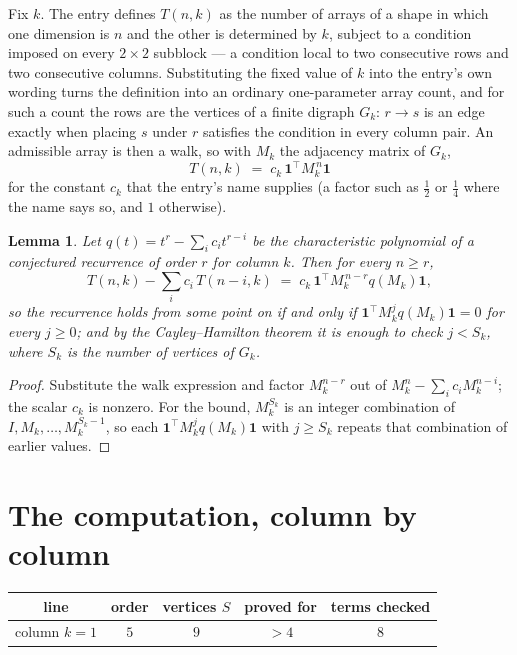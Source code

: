 \documentclass[11pt,a4paper]{article}
\theoremstyle{plain}
\newtheorem{lemma}[theorem]{Lemma}
\theoremstyle{definition}
\begin{document}
Fix $k$. The entry defines $T(n,k)$ as the number of arrays of a shape in which one dimension
is $n$ and the other is determined by $k$, subject to a condition imposed on every
$2\times2$ subblock --- a condition local to two consecutive rows and two consecutive columns.
Substituting the fixed value of $k$ into the entry's own wording turns the definition into an
ordinary one-parameter array count, and for such a count the rows are the vertices of a finite
digraph $G_k$: $r\to s$ is an edge exactly when placing $s$ under $r$ satisfies the condition
in every column pair. An admissible array is then a walk, so with $M_k$ the adjacency matrix
of $G_k$,
\[
T(n,k)\;=\;c_k\,\mathbf{1}^{\!\top}M_k^{\,n}\mathbf{1}
\]
for the constant $c_k$ that the entry's name supplies (a factor such as $\tfrac12$ or
$\tfrac14$ where the name says so, and $1$ otherwise).

\begin{lemma}\label{lem:crit}
Let $q(t)=t^{r}-\sum_i c_it^{r-i}$ be the characteristic polynomial of a conjectured
recurrence of order $r$ for column $k$. Then for every $n\ge r$,
\[
T(n,k)-\sum_i c_i\,T(n-i,k)\;=\;c_k\,\mathbf{1}^{\!\top}M_k^{\,n-r}q(M_k)\mathbf{1},
\]
so the recurrence holds from some point on if and only if
$\mathbf{1}^{\!\top}M_k^{j}q(M_k)\mathbf{1}=0$ for every $j\ge0$; and by the
Cayley--Hamilton theorem it is enough to check $j<S_k$, where $S_k$ is the number of vertices
of $G_k$.
\end{lemma}

\begin{proof}
Substitute the walk expression and factor $M_k^{n-r}$ out of $M_k^{n}-\sum_ic_iM_k^{n-i}$;
the scalar $c_k$ is nonzero. For the bound, $M_k^{S_k}$ is an integer combination of
$I,M_k,\dots,M_k^{S_k-1}$, so each $\mathbf{1}^{\!\top}M_k^{j}q(M_k)\mathbf{1}$ with
$j\ge S_k$ repeats that combination of earlier values.
\end{proof}

\section{The computation, column by column}

\begin{center}
\begin{tabular}{ccccc}
line & order & vertices $S$ & proved for & terms checked \\ \hline
column $k$$=1$ & $5$ & $9$ & $>4$ & $8$ \\
\end{tabular}
\end{center}
\end{document}
